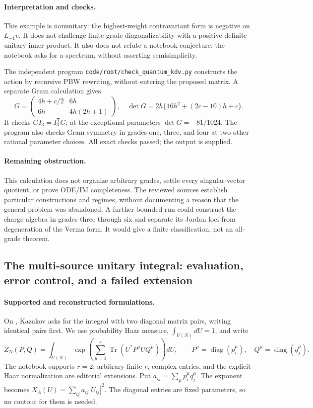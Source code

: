 \paragraph{Interpretation and checks.}
This example is nonunitary: the highest-weight contravariant form
is negative on \(L_{-1}v\). It does not challenge finite-grade
diagonalizability with a positive-definite unitary inner product.
It also does not refute a notebook conjecture: the notebook asks for
a spectrum, without asserting semisimplicity.

The independent program \texttt{code/root/check\_\allowbreak{}quantum\_\allowbreak{}kdv.py}
constructs the action by recursive PBW rewriting, without entering
the proposed matrix. A separate Gram calculation gives
\[
 G=\begin{pmatrix}4h+c/2&6h\\6h&4h(2h+1)\end{pmatrix},
 \quad
 \det G=2h\{16h^2+(2c-10)h+c\}.
\]
It checks \(GI_3=I_3^{\mathsf T}G\); at the exceptional parameters
\(\det G=-81/1024\). The program also checks Gram symmetry in
grades one, three, and four at two other rational parameter choices.
All exact checks passed; the output is supplied.

\paragraph{Remaining obstruction.}
This calculation does not organize arbitrary grades, settle every
singular-vector quotient, or prove ODE/IM completeness. The reviewed
sources establish particular constructions and regimes, without
documenting a reason that the general problem was abandoned.
A further bounded run could construct the charge algebra in grades
three through six and separate its Jordan loci from degeneration
of the Verma form. It would give a finite classification, not an
all-grade theorem.

\subsection{The multi-source unitary integral: evaluation, error control, and a failed extension}
\label{dev:unitary}

\paragraph{Supported and reconstructed formulations.}
On , Kazakov asks for the integral with two diagonal
matrix pairs, writing identical pairs first. We use probability
Haar measure, \(\int_{U(N)}dU=1\), and write
\[
 Z_N(P,Q)=\int_{U(N)}
 \exp\!\left(\sum_{\mu=1}^r
   \operatorname{Tr}(U^\ast P^\mu UQ^\mu)\right)dU,\qquad
 P^\mu=\operatorname{diag}(p_i^\mu),\quad
 Q^\mu=\operatorname{diag}(q_j^\mu).
\]
The notebook supports \(r=2\); arbitrary finite \(r\), complex entries,
and the explicit Haar normalization are editorial extensions.
Put \(a_{ij}=\sum_\mu p_i^\mu q_j^\mu\). The exponent becomes
\(X_A(U)=\sum_{ij}a_{ij}|U_{ij}|^2\).
The diagonal entries are fixed parameters, so no contour for them is
needed.

